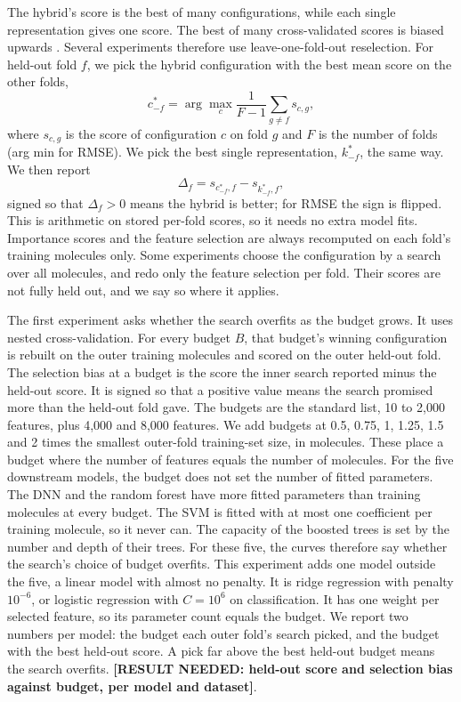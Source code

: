 The hybrid's score is the best of many configurations, while each single representation gives one score. The best of many cross-validated scores is biased upwards \citep{Varma2006}. Several experiments therefore use leave-one-fold-out reselection. For held-out fold $f$, we pick the hybrid configuration with the best mean score on the other folds,
\[
c^*_{-f} = \arg\max_c \frac{1}{F-1}\sum_{g\neq f} s_{c,g},
\]
where $s_{c,g}$ is the score of configuration $c$ on fold $g$ and $F$ is the number of folds (arg min for RMSE). We pick the best single representation, $k^*_{-f}$, the same way. We then report
\[
\Delta_f = s_{c^*_{-f},f} - s_{k^*_{-f},f},
\]
signed so that $\Delta_f>0$ means the hybrid is better; for RMSE the sign is flipped. This is arithmetic on stored per-fold scores, so it needs no extra model fits. Importance scores and the feature selection are always recomputed on each fold's training molecules only. Some experiments choose the configuration by a search over all molecules, and redo only the feature selection per fold. Their scores are not fully held out, and we say so where it applies.

The first experiment asks whether the search overfits as the budget grows. It uses nested cross-validation. For every budget $B$, that budget's winning configuration is rebuilt on the outer training molecules and scored on the outer held-out fold. The selection bias at a budget is the score the inner search reported minus the held-out score. It is signed so that a positive value means the search promised more than the held-out fold gave. The budgets are the standard list, 10 to 2,000 features, plus 4,000 and 8,000 features. We add budgets at 0.5, 0.75, 1, 1.25, 1.5 and 2 times the smallest outer-fold training-set size, in molecules. These place a budget where the number of features equals the number of molecules. For the five downstream models, the budget does not set the number of fitted parameters. The DNN and the random forest have more fitted parameters than training molecules at every budget. The SVM is fitted with at most one coefficient per training molecule, so it never can. The capacity of the boosted trees is set by the number and depth of their trees. For these five, the curves therefore say whether the search's choice of budget overfits. This experiment adds one model outside the five, a linear model with almost no penalty. It is ridge regression with penalty $10^{-6}$, or logistic regression with $C = 10^{6}$ on classification. It has one weight per selected feature, so its parameter count equals the budget. We report two numbers per model: the budget each outer fold's search picked, and the budget with the best held-out score. A pick far above the best held-out budget means the search overfits. \textbf{[RESULT NEEDED: held-out score and selection bias against budget, per model and dataset]}.

